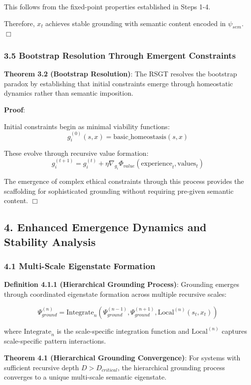 \documentclass[
]{article}
\begin{document}
This follows from the fixed-point properties established in Steps 1-4.

Therefore, \(x_t\) achieves stable grounding with semantic content
encoded in \(\psi_{sem}\). \(\Box \)

\subsubsection{3.5 Bootstrap Resolution Through Emergent
Constraints}\label{bootstrap-resolution-through-emergent-constraints}

\textbf{Theorem 3.2 (Bootstrap Resolution)}: The RSGT resolves the
bootstrap paradox by establishing that initial constraints emerge
through homeostatic dynamics rather than semantic imposition.

\textbf{Proof}:

Initial constraints begin as minimal viability functions:
\[g_i^{(0)}(s, x) = \text{basic\_homeostasis}(s, x)\]

These evolve through recursive value formation:
\[g_i^{(t+1)} = g_i^{(t)} + \eta \nabla_{g_i} \Phi_{value}(\text{experience}_t, \text{values}_t)\]

The emergence of complex ethical constraints through this process
provides the scaffolding for sophisticated grounding without requiring
pre-given semantic content. \(\Box \)

\subsection{4. Enhanced Emergence Dynamics and Stability
Analysis}\label{enhanced-emergence-dynamics-and-stability-analysis}

\subsubsection{4.1 Multi-Scale Eigenstate
Formation}\label{multi-scale-eigenstate-formation}

\textbf{Definition 4.1.1 (Hierarchical Grounding Process)}: Grounding
emerges through coordinated eigenstate formation across multiple
recursive scales:

\[\Psi_{ground}^{(n)} = \text{Integrate}_n(\Psi_{ground}^{(n-1)}, \Psi_{ground}^{(n+1)}, \text{Local}^{(n)}(s_t, x_t))\]

where \(\text{Integrate}_n\) is the scale-specific integration function
and \(\text{Local}^{(n)}\) captures scale-specific pattern interactions.

\textbf{Theorem 4.1 (Hierarchical Grounding Convergence)}: For systems
with sufficient recursive depth \(D > D_{critical}\), the hierarchical
grounding process converges to a unique multi-scale semantic eigenstate.
\end{document}
